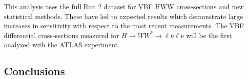 This analysis uses the full Run 2 dataset for VBF HWW cross-sections and new statistical methods. These have led to expected results which demonstrate large increases in sensitivity with respect to the most recent measurements. The VBF differential cross-sections measured for $H\rightarrow WW^*\rightarrow\ell\nu\ell\nu$ will be the first analyzed with the ATLAS experiment. 


\subsection{Conclusions}

